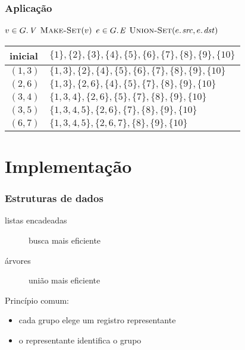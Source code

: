 \documentclass{beamer}
\begin{document}
\begin{frame}

\frametitle{Aplicação}

\begin{codebox}
\li \For $v \in \attrib{G}{V}$
\li \Do $\textnormal{\scshape Make-Set}(v)$
    \End
\li \For $e \in \attrib{G}{E}$
\li \Do $\proc{Union-Set}(\attrib{e}{src}, \attrib{e}{dst})$
    \End
\end{codebox}
\pause
\begin{center}
\begin{tabular}{|l|l|}
\hline
inicial & $\{1\},\{2\},\{3\},\{4\},\{5\},\{6\},\{7\},\{8\},\{9\},\{10\}$ \\
\hline
$(1,3)$ & $\{1,3\},\{2\},\{4\},\{5\},\{6\},\{7\},\{8\},\{9\},\{10\}$ \\
\hline
$(2,6)$ & $\{1,3\},\{2,6\},\{4\},\{5\},\{7\},\{8\},\{9\},\{10\}$ \\
\hline
$(3,4)$ & $\{1,3,4\},\{2,6\},\{5\},\{7\},\{8\},\{9\},\{10\}$ \\
\hline
$(3,5)$ & $\{1,3,4,5\},\{2,6\},\{7\},\{8\},\{9\},\{10\}$ \\
\hline
$(6,7)$ & $\{1,3,4,5\},\{2,6,7\},\{8\},\{9\},\{10\}$ \\
\hline
\end{tabular}
\end{center}

\end{frame}

\section{Implementação}

\begin{frame}
\frametitle{Estruturas de dados}

\begin{description}
\item[listas encadeadas] busca mais eficiente
\item[árvores] união mais eficiente
\end{description}

Princípio comum: 
\begin{itemize}
\item cada grupo elege um registro \alert{representante}
\item o representante identifica o grupo
\end{itemize}


\end{frame}
\end{document}
